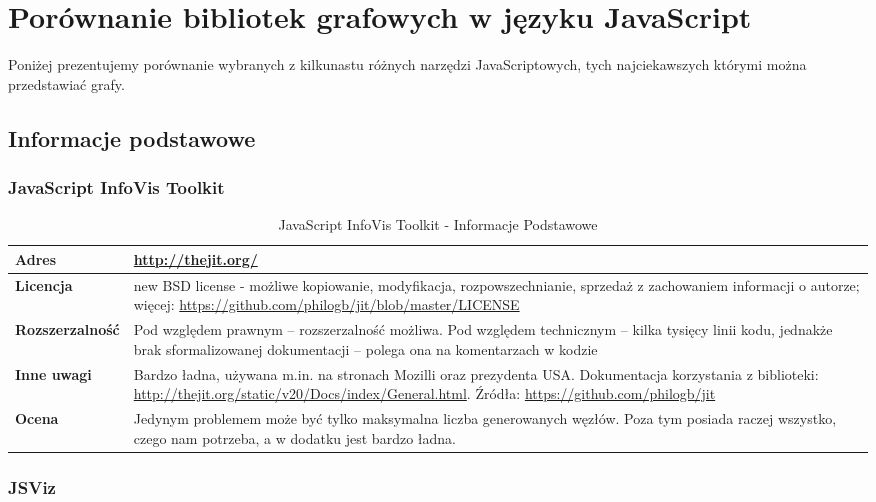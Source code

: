 \chapter{Porównanie bibliotek grafowych w języku JavaScript}
Poniżej prezentujemy porównanie wybranych z kilkunastu różnych narzędzi JavaScriptowych, tych najciekawszych którymi można przedstawiać grafy.

\section{Informacje podstawowe}
\subsection{JavaScript InfoVis Toolkit}

\begin{table}[!htbp]
\begin{tabularx}{\textwidth}{ ||l|R|| }
\hline
\textbf{Adres} & \url{http://thejit.org/} \\
\hline
\textbf{Licencja} & new BSD license - możliwe kopiowanie, modyfikacja, rozpowszechnianie, sprzedaż z zachowaniem informacji o autorze; więcej: \url{https://github.com/philogb/jit/blob/master/LICENSE} \\
\hline

\textbf{Rozszerzalność} & Pod względem prawnym -- rozszerzalność możliwa. Pod względem technicznym -- kilka tysięcy linii kodu, jednakże brak sformalizowanej dokumentacji -- polega ona na komentarzach w kodzie \\
\hline

\textbf{Inne uwagi} & Bardzo ładna, używana m.in. na stronach Mozilli oraz prezydenta USA. Dokumentacja korzystania z biblioteki: \url{http://thejit.org/static/v20/Docs/index/General.html}.
Źródła: \url{https://github.com/philogb/jit} \\
\hline

\textbf{Ocena} & Jedynym problemem może być tylko maksymalna liczba generowanych węzłów. Poza tym posiada raczej wszystko, czego nam potrzeba, a w dodatku jest bardzo ładna. \\
\hline
\end{tabularx}
\caption{JavaScript InfoVis Toolkit - Informacje Podstawowe}
\end{table}


\vfill
\subsection{JSViz}

